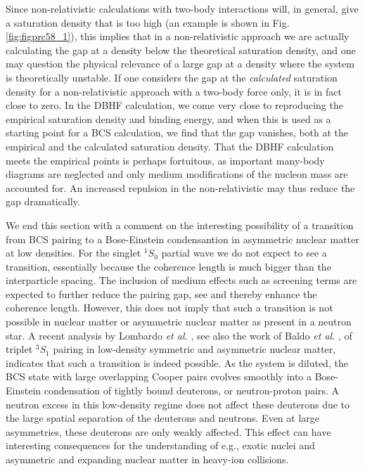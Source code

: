 \documentclass[rmp,aps,floatfix]{revtex4}
\begin{document}
Since non-relativistic calculations with two-body 
interactions will, in general, give a saturation density that is too high
(an example is shown in Fig. \ref{fig:figprc58_1}), 
this implies that in a  
non-relativistic approach we are actually calculating the 
gap at a density below the theoretical saturation density, and one 
may question the physical relevance of a large gap at a density where 
the system is theoretically unstable.  If one considers the gap 
at the {\em calculated} saturation density for a non-relativistic
approach with a two-body force only, it is in fact close 
to zero.  
In the DBHF calculation, we come 
very close to reproducing the empirical saturation density and binding 
energy, and when this is used as a starting point for a BCS calculation, 
we find that the gap vanishes, both at the empirical and the calculated 
saturation density.  That the DBHF calculation meets the empirical 
points is perhaps fortuitous, as important many-body diagrams are 
neglected and only medium modifications of the nucleon mass are 
accounted for.  An increased repulsion in the non-relativistic 
may thus reduce the gap dramatically.



We end this section with a comment on the interesting possibility of
a transition from BCS pairing to a Bose-Einstein
condensantion in asymmetric nuclear matter at low densities. 
For the singlet
$^1S_0$ partial wave we do not expect
to see a transition, essentially because the coherence length is much 
bigger than the interparticle spacing.
The inclusion of medium effects such as screening
terms are expected to further reduce the pairing gap,
see \cite{deblasio97} and thereby enhance the coherence
length. However, this does not imply that such a transition
is not possible in nuclear matter or asymmetric nuclear matter as present 
in  a neutron star. A recent analysis by Lombardo
{\em et al.} \cite{lombardo2001}, see also the work of Baldo {\em et al.} 
\cite{bls95}, of
triplet $^3S_1$ pairing in low-density symmetric and asymmetric nuclear
matter, indicates that such a transition
is indeed possible. As the system is diluted, the BCS state with large
overlapping Cooper pairs evolves smoothly into a Bose-Einstein condensation
of tightly bound deuterons, or neutron-proton pairs. A neutron excess in this
low-density regime does not affect these deuterons due to the large spatial
separation of the deuterons and neutrons. Even at large asymmetries, these
deuterons are only weakly affected. This effect can have interesting 
consequences for the understanding of e.g., exotic nuclei and asymmetric and 
expanding nuclear matter in heavy-ion collisions.
\end{document}
